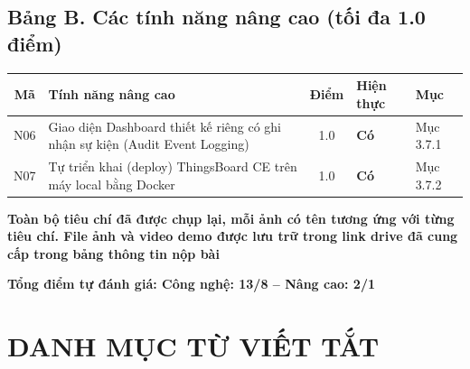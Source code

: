 \subsection*{Bảng B. Các tính năng nâng cao (tối đa 1.0 điểm)}

\begin{table}[H]
\centering
\small
\setlength{\tabcolsep}{5pt}
\renewcommand{\arraystretch}{1.25}
\begin{tabularx}{\textwidth}{|c|>{\raggedright\arraybackslash}X|c|>{\centering\arraybackslash}p{1.8cm}|>{\centering\arraybackslash}p{1.8cm}|}
\hline
\textbf{Mã} & \textbf{Tính năng nâng cao} & \textbf{Điểm} & \textbf{Hiện thực} & \textbf{Mục} \\ \hline
N06 & Giao diện Dashboard thiết kế riêng có ghi nhận sự kiện (Audit Event Logging) & 1.0 & \textbf{Có} & Mục 3.7.1 \\ \hline
N07 & Tự triển khai (deploy) ThingsBoard CE trên máy local bằng Docker & 1.0 & \textbf{Có} & Mục 3.7.2 \\ \hline
\end{tabularx}
\end{table}


\textbf{Toàn bộ tiêu chí đã được chụp lại, mỗi ảnh có tên tương ứng với từng tiêu chí. File ảnh và video demo được lưu trữ trong link drive đã cung cấp trong bảng thông tin nộp bài }

\textbf{Tổng điểm tự đánh giá: Công nghệ: 13/8   --   Nâng cao: 2/1}

\bigskip
\section*{DANH MỤC TỪ VIẾT TẮT}

